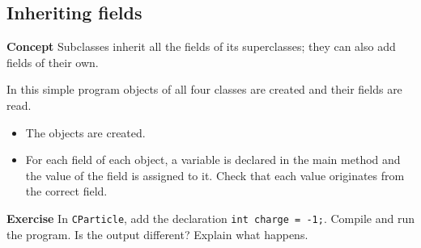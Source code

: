 \subsection{Inheriting fields}\label{inher.01}

\textbf{Concept} 
Subclasses inherit all the fields of its superclasses; they can also add
fields of their own.


In this simple program objects of all four classes are created and their fields
are read.
\begin{itemize}
\item The objects are created.
\item For each field of each object, a variable is declared in the main method
and the value of the field is assigned to it. Check that each value originates
from the correct field.
\end{itemize}

\textbf{Exercise} In \texttt{CParticle}, add the declaration \texttt{int
charge = -1;}. Compile and run the program. Is the output different?
Explain what happens.
